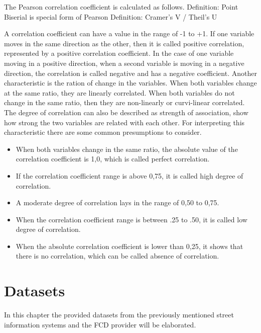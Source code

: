 \documentclass[a4paper,12pt]{report}
\begin{document}
The Pearson correlation coefficient is calculated as follows.
Definition: Point Biserial is special form of Pearson
Definition: Cramer’s V / Theil’s U

A correlation coefficient can have a value in the range of -1 to +1. If one variable moves in the same direction as the other, then it is called positive correlation, represented by a positive correlation coefficient. In the case of one variable moving in a positive direction, when a second variable is moving in a negative direction, the correlation is called negative and has a negative coefficient. 
Another characteristic is the ration of change in the variables. When both variables change at the same ratio, they are linearly correlated. When both variables do not change in the same ratio, then they are non-linearly or curvi-linear correlated.
The degree of correlation can also be described as strength of association, show how strong the two variables are related with each other. For interpreting this characteristic there are some common presumptions to consider.

\begin{itemize}
  \item When both variables change in the same ratio, the absolute value of the correlation coefficient is 1,0, which is called perfect correlation.
  \item If the correlation coefficient range is above 0,75, it is called high degree of correlation.
  \item A moderate degree of correlation lays in the range of 0,50 to 0,75.
  \item When the correlation coefficient range is between .25 to .50, it is called low degree of correlation.
  \item When the absolute correlation coefficient is lower than 0,25, it shows that there is no correlation, which can be called absence of correlation.
\end{itemize}	
	
\chapter{Datasets}
In this chapter the provided datasets from the previously mentioned street information systems and the FCD provider will be elaborated. 
\end{document}
